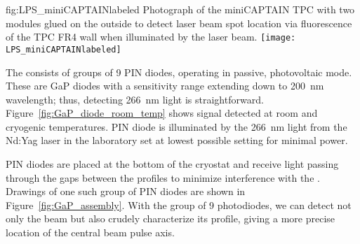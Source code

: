 \begin{dunefigure}{fig:LPS_miniCAPTAINlabeled}
{Photograph of the miniCAPTAIN TPC with two  modules glued on the outside to detect laser beam spot location via fluorescence of the TPC FR4 wall when illuminated by the laser beam.}
\texttt{[image: LPS\_miniCAPTAINlabeled]} 
\end{dunefigure}

The  consists of groups of \num{9} PIN diodes, operating in passive, photovoltaic mode. These are GaP diodes with a sensitivity range extending down to  \SI{200}{\nano\m} wavelength; thus, detecting \SI{266}{\nano\m} light is straightforward. Figure~\ref{fig:GaP_diode_room_temp} shows signal detected at room and cryogenic temperatures. PIN diode is illuminated by the \SI{266}{\nano\m} light from the Nd:Yag
laser in the laboratory 
set at lowest possible setting for minimal power.  

PIN diodes are placed at the bottom of the cryostat and receive light passing through the gaps between the  profiles to minimize interference with the . Drawings of one such group of PIN diodes are shown in Figure~\ref{fig:GaP_assembly}. With the group of \num{9} photodiodes, we can detect not only the beam but also crudely characterize its profile, giving a more precise location of the central beam pulse axis.




